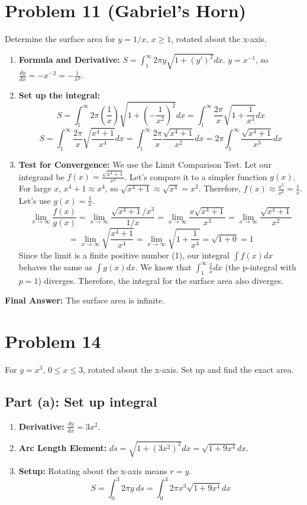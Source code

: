 \documentclass{article}
\begin{document}
\section{Problem 11 (Gabriel's Horn)}
Determine the surface area for \(y=1/x\), \(x \ge 1\), rotated about the x-axis.
\begin{enumerate}
    \item \textbf{Formula and Derivative:} \(S = \int_{1}^{\infty} 2\pi y \sqrt{1+(y')^2} dx\).
    \(y=x^{-1}\), so \(\frac{dy}{dx} = -x^{-2} = -\frac{1}{x^2}\).
    \item \textbf{Set up the integral:}
    \[ S = \int_{1}^{\infty} 2\pi \left(\frac{1}{x}\right) \sqrt{1+\left(-\frac{1}{x^2}\right)^2} dx = \int_{1}^{\infty} \frac{2\pi}{x} \sqrt{1+\frac{1}{x^4}} dx \]
    \[ S = \int_{1}^{\infty} \frac{2\pi}{x} \sqrt{\frac{x^4+1}{x^4}} dx = \int_{1}^{\infty} \frac{2\pi}{x} \frac{\sqrt{x^4+1}}{x^2} dx = 2\pi \int_{1}^{\infty} \frac{\sqrt{x^4+1}}{x^3} dx \]
    \item \textbf{Test for Convergence:} We use the Limit Comparison Test. Let our integrand be \(f(x) = \frac{\sqrt{x^4+1}}{x^3}\). Let's compare it to a simpler function \(g(x)\). For large \(x\), \(x^4+1 \approx x^4\), so \(\sqrt{x^4+1} \approx \sqrt{x^4} = x^2\).
    Therefore, \(f(x) \approx \frac{x^2}{x^3} = \frac{1}{x}\). Let's use \(g(x) = \frac{1}{x}\).
    \[ \lim_{x \to \infty} \frac{f(x)}{g(x)} = \lim_{x \to \infty} \frac{\sqrt{x^4+1}/x^3}{1/x} = \lim_{x \to \infty} \frac{x\sqrt{x^4+1}}{x^3} = \lim_{x \to \infty} \frac{\sqrt{x^4+1}}{x^2} \]
    \[ = \lim_{x \to \infty} \sqrt{\frac{x^4+1}{x^4}} = \lim_{x \to \infty} \sqrt{1+\frac{1}{x^4}} = \sqrt{1+0} = 1 \]
    Since the limit is a finite positive number (1), our integral \(\int f(x)dx\) behaves the same as \(\int g(x)dx\).
    We know that \(\int_{1}^{\infty} \frac{1}{x} dx\) (the p-integral with \(p=1\)) diverges.
    Therefore, the integral for the surface area also diverges.
\end{enumerate}
\textbf{Final Answer:} The surface area is infinite.

\section{Problem 14}
For \(y=x^3\), \(0 \le x \le 3\), rotated about the x-axis. Set up and find the exact area.
\subsection{Part (a): Set up integral}
\begin{enumerate}
    \item \textbf{Derivative:} \(\frac{dy}{dx} = 3x^2\).
    \item \textbf{Arc Length Element:} \(ds = \sqrt{1+(3x^2)^2}dx = \sqrt{1+9x^4}dx\).
    \item \textbf{Setup:} Rotating about the x-axis means \(r=y\).
    \[ S = \int_{0}^{3} 2\pi y \ ds = \int_{0}^{3} 2\pi x^3 \sqrt{1+9x^4} dx \]
\end{enumerate}
\end{document}
